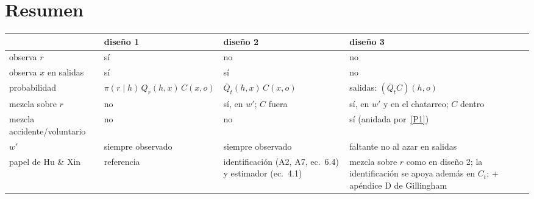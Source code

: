 \documentclass[11pt]{article}
\newcommand{\1}{\mathbf{1}}
\newcommand{\Qbar}{\bar Q}
\begin{document}
\section{Resumen}

\begin{center}
\small
\begin{tabularx}{\textwidth}{>{\raggedright\arraybackslash}p{3.3cm}
  >{\raggedright\arraybackslash}X >{\raggedright\arraybackslash}X >{\raggedright\arraybackslash}X}
\toprule
 & diseño 1 & diseño 2 & diseño 3\\
\midrule
observa $r$ & sí & no & no\\
observa $x$ en salidas & sí & sí & no\\
probabilidad & $\pi(r\mid h)\,Q_r(h,x)\,C(x,o)$ & $\Qbar_t(h,x)\,C(x,o)$ & salidas: $(\Qbar_tC)(h,o)$\\
mezcla sobre $r$ & no & sí, en $w'$; $C$ fuera & sí, en $w'$ y en el chatarreo; $C$ dentro\\
mezcla accidente/voluntario & no & no & sí (anidada por~\ref{P1})\\
$w'$ & siempre observado & siempre observado & faltante no al azar en salidas\\
papel de Hu \& Xin & referencia & identificación (A2, A7, ec.~6.4) y estimador (ec.~4.1) & mezcla sobre $r$ como en diseño 2; la identificación se apoya además en $C_t$; + apéndice D de Gillingham\\
\bottomrule
\end{tabularx}
\end{center}
\end{document}
